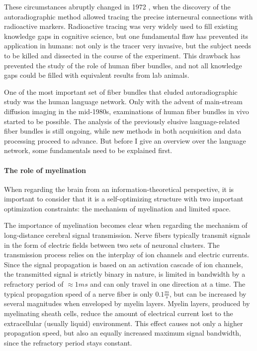 These circumstances abruptly changed in 1972 \cite{1.1.history}, when the discovery of the autoradiographic method allowed tracing the precise interneural connections with radioactive markers.
Radioactive tracing was very widely used to fill existing knowledge gaps in cognitive science, but one fundamental flaw has prevented its application in humans: not only is the tracer very invasive, but the subject needs to be killed and dissected in the course of the experiment.
This drawback has prevented the study of the role of human fiber bundles, and not all knowledge gaps could be filled with equivalent results from lab animals.

One of the most important set of fiber bundles that eluded autoradiographic study was the human language network.
Only with the advent of main-stream diffusion imaging \cite{1.1.firstDiffusion} in the mid-1980s, examinations of human fiber bundles in vivo started to be possible.
The analysis of the previously elusive language-related fiber bundles is still ongoing, while new methods in both acquisition and data processing proceed to advance.
But before I give an overview over the language network, some fundamentals need to be explained first.

\paragraph{The role of myelination}
When regarding the brain from an information-theoretical perspective, it is important to consider that it is a self-optimizing structure with two important optimization constraints: the mechanism of myelination and limited space.

The importance of myelination becomes clear when regarding the mechanism of long-distance cerebral signal transmission.
Nerve fibers typically transmit signals in the form of electric fields between two sets of neuronal clusters.
The transmission process relies on the interplay of ion channels and electric currents.
Since the signal propagation is based on an activation cascade of ion channels, the transmitted signal is strictly binary in nature, is limited in bandwidth by a refractory period of $\approx 1ms$ and can only travel in one direction at a time.
The typical propagation speed of a nerve fiber is only $0.1\frac{m}{s}$, but can be increased by several magnitudes when enveloped by myelin layers.
Myelin layers, produced by myelinating sheath cells, reduce the amount of electrical current lost to the extracellular (usually liquid) environment.
This effect causes not only a higher propagation speed, but also an equally increased maximum signal bandwidth, since the refractory period stays constant.

